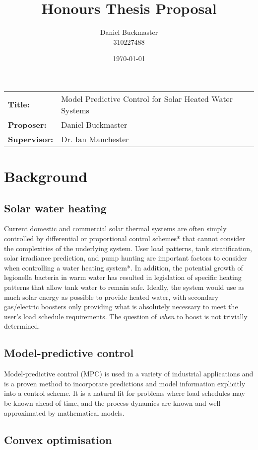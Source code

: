 \documentclass{article}
\title{Honours Thesis Proposal}
\date{\today}
\author{Daniel Buckmaster \\ 310227488}
\begin{document}
\maketitle

\begin{tabular}{ll}
	{\bf Title:} & Model Predictive Control for Solar Heated Water Systems \\
	{\bf Proposer:} & Daniel Buckmaster \\
	{\bf Supervisor:} & Dr. Ian Manchester \\
\end{tabular}

\section{Background}

\subsection{Solar water heating}

Current domestic and commercial solar thermal systems are often simply controlled
by differential or proportional control schemes* that cannot consider the
complexities of the underlying system. User load patterns, tank stratification,
solar irradiance prediction, and pump hunting are important factors to consider
when controlling a water heating system*. In addition, the potential growth of
legionella bacteria in warm water has resulted in legislation of specific heating
patterns that allow tank water to remain safe. Ideally, the system would use as
much solar energy as possible to provide heated water, with secondary gas/electric
boosters only providing what is absolutely necessary to meet the user's load
schedule requirements. The question of {\it when} to boost is not trivially
determined.

\subsection{Model-predictive control}

Model-predictive control (MPC) is used in a variety of industrial applications
\cite{Camacho04} and is a proven method to incorporate predictions and model
information explicitly into a control scheme. It is a natural fit for problems
where load schedules may be known ahead of time, and the process dynamics are
known and well-approximated by mathematical models.

\subsection{Convex optimisation}
\end{document}
